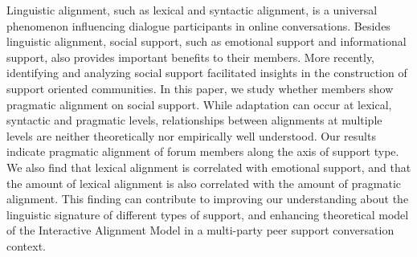 Linguistic alignment, such as lexical and syntactic alignment, is a universal phenomenon influencing dialogue participants in online conversations. Besides linguistic alignment, social support, such as emotional support and informational support, also provides important benefits to their members. More recently, identifying and analyzing social support facilitated insights in the construction of support oriented communities. In this paper, we study whether members show pragmatic alignment on social support. While adaptation can occur at lexical, syntactic and pragmatic levels, relationships between alignments at multiple levels are neither theoretically nor empirically well understood. Our results indicate pragmatic alignment of forum members along the axis of support type. We also find that lexical alignment is correlated with emotional support, and that the amount of lexical alignment is also correlated with the amount of pragmatic alignment.  This finding can contribute to improving our understanding about the linguistic signature of different types of support, and enhancing theoretical model of the Interactive Alignment Model in a multi-party peer support conversation context.
